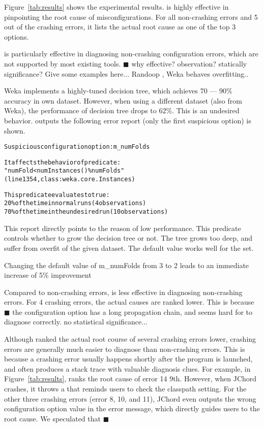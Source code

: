 

Figure~\ref{tab:results} shows the experimental results.
\ourtool is highly effective in pinpointing the root cause of
misconfigurations. For all \noncrash non-crashing errors
and 5 out of the \crash crashing errors, it lists the actual root cause as one of the top 3 options. 


\ourtool is particularly effective
in diagnosing non-crashing configuration errors, which are not supported
by most existing tools. $\blacksquare$ why effective? observation?
statically significance? Give some examples here... Randoop ,
Weka behaves overfitting..

Weka implements a highly-tuned decision tree, which achieves 70 --- 90\%
accuracy in own dataset. However, when using a different dataset (also
from Weka), the performance of decision tree drops to 62\%. This is an
undesired behavior. \ourtool outputs the following error report (only
the first suspicious option) is shown.


\begin{CodeOut}
\begin{alltt} 
Suspicious configuration option: m\_numFolds

It affects the behavior of predicate:
"numFold < numInstances() \% numFolds"
(line 1354, class: weka.core.Instances) 

This predicate evaluates to true:
  20\% of the time in normal runs (4 observations)
  70\% of the time in the undesired run (10 observations)

\end{alltt}
\end{CodeOut}

This report directly points to the reason of low performance.
This predicate controls whether to grow the decision tree or not.
The tree grows too deep, and suffer from overfit of the given dataset.
The default value works well for the set.

Changing the default value of m\_numFolds from 3 to 2 leads to
an immediate increase of 5\% improvement

Compared to non-crashing errors, \ourtool is less effective
in diagnosing non-crashing errors. For 4 crashing errors,
the actual causes are ranked lower.
This is because $\blacksquare$ the configuration option has
a long propagation chain, and seems hard for \ourtool
to diagnose correctly. no statistical significance...

Although \ourtool ranked the actual root course of several
crashing errors lower, crashing errors are generally much easier to diagnose than non-crashing errors.
This is because a crashing error usually happens shortly after the program
is launched, and often produces a stack trace with valuable diagnosis clues.
For example, in Figure~\ref{tab:results}, \ourtool ranks the root cause of
error 14  9th.
However, when JChord crashes, it throws a 
that reminds users to check the classpath setting. For the other three crashing errors (error 8, 10, and 11),
JChord even outputs the wrong configuration option value in the
error message, which
directly guides users to the root cause. We speculated that $\blacksquare$

